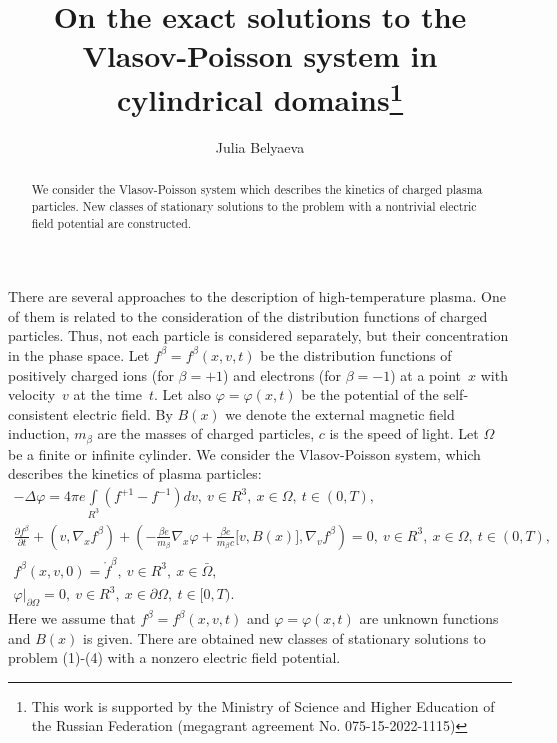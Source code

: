 \documentclass[12pt]{llncs}
\begin{document}
\fi


\title{
On the exact solutions to the Vlasov-Poisson system in  cylindrical domains\thanks{This work is supported by the Ministry of Science and Higher Education of the Russian Federation (megagrant agreement No. 075-15-2022-1115)
}}

\author{Julia Belyaeva  
}

\maketitle

\begin{abstract}
We consider the Vlasov-Poisson system which 
describes the kinetics of charged plasma particles. 
New classes of stationary solutions to the problem with a nontrivial electric field potential are constructed. 


\end{abstract}

There are several approaches to the description of high-temperature plasma. One of them is related to the consideration of the distribution functions of charged particles. Thus, not each particle is considered separately, but their concentration in the phase space.
Let $f^\beta=f^\beta(x,v,t)$
be the distribution functions
of  positively charged ions (for $\beta=+1$) 
and electrons (for $\beta=-1$) at a point~$x$ with velocity~$v$
at the time~$t$.
Let also $\varphi=\varphi(x,t)$ be the potential of the self-consistent electric field. 
By $B(x)$ we denote the external magnetic field induction, 
$m_{\beta}$ are the masses of charged particles, 
$c$ is the speed of light. Let $\Omega$ be a finite or infinite cylinder.
We consider the Vlasov-Poisson system, which describes the kinetics of plasma particles:
\begin{gather}
- \Delta \varphi= 4 \pi e \int \limits_{R^3} (f^{+1}-f^{-1})dv, \ v \in R^3,\ x \in \Omega, \ t \in (0,T),  \\
 \frac{\partial f^{\beta}}{\partial t}+\left( v, \nabla_{\!x}f^{\beta}\right)
+\left( 
-\frac{\beta e}{m_\beta}
\nabla_{\!x}\varphi+\frac{\beta e}{m_\beta c}\big[v,
B(x)\big], \nabla_{\!v}f^{\beta}\right)=0,  \ v \in R^3,\ x \in \Omega, \ t \in (0,T),\\
f^{\beta}(x,v,0)= \mathring{f}^{\beta}, \ v \in R^3,\ x \in \bar{\Omega},\\
\varphi |_{\partial \Omega}=0,  \ v \in R^3,\ x \in \partial \Omega, \ t \in [0,T).
   \end{gather}
Here we assume that $f^\beta=f^\beta(x,v,t)$ and 
$\varphi=\varphi(x,t)$ are unknown functions and 
$B(x)$ is given.
There are obtained new classes of stationary solutions to problem (1)-(4)
with a nonzero electric field potential.
\end{document}

